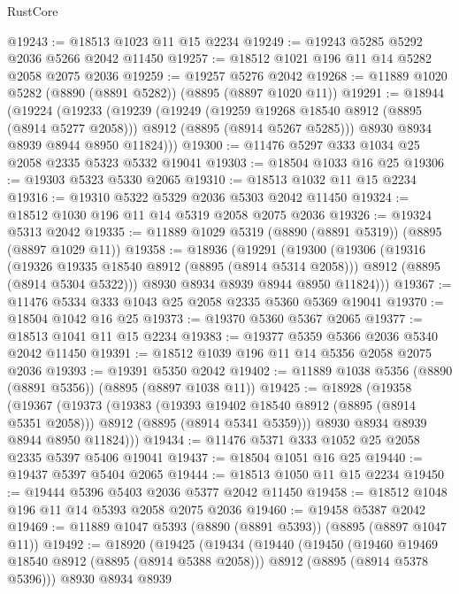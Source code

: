 \begin{lexlean}{RustCore}
\begin{coremodule}
@19243 := @18513 @1023 @11 @15 @2234
@19249 := @19243 @5285 @5292 @2036 @5266 @2042 @11450
@19257 := @18512 @1021 @196 @11 @14 @5282 @2058 @2075 @2036
@19259 := @19257 @5276 @2042
@19268 := @11889 @1020 @5282 (@8890 (@8891 @5282)) (@8895 (@8897 @1020 @11))
@19291 := @18944
    (@19224
      (@19233
        (@19239
          (@19249
            (@19259 @19268 @18540 @8912 (@8895 (@8914 @5277 @2058)))
            @8912
            (@8895 (@8914 @5267 @5285)))
          @8930
          @8934
          @8939
          @8944
          @8950
          @11824)))
@19300 := @11476 @5297 @333 @1034 @25 @2058 @2335 @5323 @5332 @19041
@19303 := @18504 @1033 @16 @25
@19306 := @19303 @5323 @5330 @2065
@19310 := @18513 @1032 @11 @15 @2234
@19316 := @19310 @5322 @5329 @2036 @5303 @2042 @11450
@19324 := @18512 @1030 @196 @11 @14 @5319 @2058 @2075 @2036
@19326 := @19324 @5313 @2042
@19335 := @11889 @1029 @5319 (@8890 (@8891 @5319)) (@8895 (@8897 @1029 @11))
@19358 := @18936
    (@19291
      (@19300
        (@19306
          (@19316
            (@19326 @19335 @18540 @8912 (@8895 (@8914 @5314 @2058)))
            @8912
            (@8895 (@8914 @5304 @5322)))
          @8930
          @8934
          @8939
          @8944
          @8950
          @11824)))
@19367 := @11476 @5334 @333 @1043 @25 @2058 @2335 @5360 @5369 @19041
@19370 := @18504 @1042 @16 @25
@19373 := @19370 @5360 @5367 @2065
@19377 := @18513 @1041 @11 @15 @2234
@19383 := @19377 @5359 @5366 @2036 @5340 @2042 @11450
@19391 := @18512 @1039 @196 @11 @14 @5356 @2058 @2075 @2036
@19393 := @19391 @5350 @2042
@19402 := @11889 @1038 @5356 (@8890 (@8891 @5356)) (@8895 (@8897 @1038 @11))
@19425 := @18928
    (@19358
      (@19367
        (@19373
          (@19383
            (@19393 @19402 @18540 @8912 (@8895 (@8914 @5351 @2058)))
            @8912
            (@8895 (@8914 @5341 @5359)))
          @8930
          @8934
          @8939
          @8944
          @8950
          @11824)))
@19434 := @11476 @5371 @333 @1052 @25 @2058 @2335 @5397 @5406 @19041
@19437 := @18504 @1051 @16 @25
@19440 := @19437 @5397 @5404 @2065
@19444 := @18513 @1050 @11 @15 @2234
@19450 := @19444 @5396 @5403 @2036 @5377 @2042 @11450
@19458 := @18512 @1048 @196 @11 @14 @5393 @2058 @2075 @2036
@19460 := @19458 @5387 @2042
@19469 := @11889 @1047 @5393 (@8890 (@8891 @5393)) (@8895 (@8897 @1047 @11))
@19492 := @18920
    (@19425
      (@19434
        (@19440
          (@19450
            (@19460 @19469 @18540 @8912 (@8895 (@8914 @5388 @2058)))
            @8912
            (@8895 (@8914 @5378 @5396)))
          @8930
          @8934
          @8939

\end{coremodule}
\end{lexlean}
